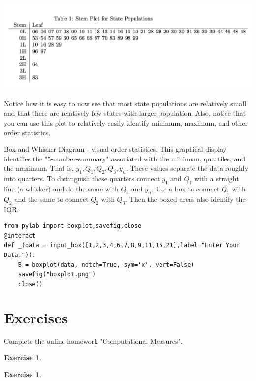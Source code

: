\documentclass[10pt,]{book}
\theoremstyle{plain}
\theoremstyle{definition}
\theoremstyle{definition}
\theoremstyle{definition}
\newtheorem{exercise}[theorem]{Exercise}
\numberwithin{equation}{section}
\begin{document}
	
\includegraphics[width=1\linewidth]{images/stemandleaf.png}


Notice how it is easy to now see that most state populations are relatively small and that there are relatively few states with larger population. Also, notice that you can use this plot to relatively easily identify minimum, maximum, and other order statistics.		
		
\par
Box and Whisker Diagram - visual order statistics. This graphical display identifies the "5-number-summary" associated with the minimum, quartiles, and the maximum. That is, \(y_1, Q_1, Q_2, Q_3, y_n\).  These values separate the data roughly into quarters. To distinguish these quarters connect \(y_1\) and \(Q_1\) with a straight line (a whisker) and do the same with \(Q_3\) and \(y_n\). Use a box to connect \(Q_1\) with \(Q_2\) and the same to connect \(Q_2\) with \(Q_3\). Then the boxed areas also identify the IQR.    
\begin{lstlisting}[style=sageinput]
from pylab import boxplot,savefig,close
@interact
def _(data = input_box([1,2,3,4,6,7,8,9,11,15,21],label="Enter Your Data:")):
    B = boxplot(data, notch=True, sym='x', vert=False)
    savefig("boxplot.png")
    close()
\end{lstlisting}

\typeout{************************************************}
\typeout{************************************************}
\section[{Exercises}]{Exercises}\label{section-9}
Complete the online homework "Computational Measures".%
\begin{exercise}\label{exercise-3}
\end{exercise}
\begin{exercise}\label{exercise-4}
\end{exercise}
\typeout{************************************************}
\typeout{************************************************}
\end{document}
